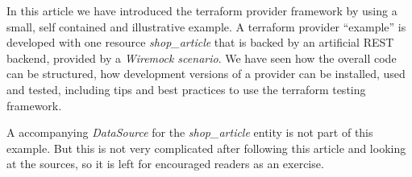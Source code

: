 \documentclass[paper=a4,11pt,numbers=noenddot]{article}
\begin{document}
In this article we have introduced the terraform provider framework by using a small, self contained and illustrative example. A terraform provider ``example'' is developed with one resource \emph{shop\_article} that is backed by an artificial REST backend, provided by a \emph{Wiremock scenario}. We have seen how the overall code can be structured, how development versions of a provider can be installed, used and tested, including tips and best practices to use the terraform testing framework.

A accompanying \emph{DataSource} for the \emph{shop\_article} entity is not part of this example. But this is not very complicated after following this article and looking at the sources, so it is left for encouraged readers as an exercise.

\printbibliography[heading=bibintoc]
\end{document}
